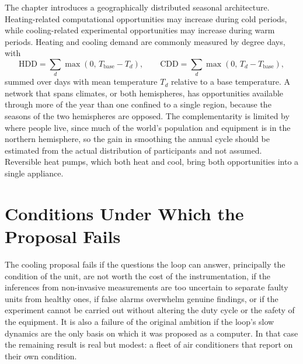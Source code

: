 The chapter introduces a geographically distributed seasonal architecture. Heating-related computational opportunities may increase during cold periods, while cooling-related experimental opportunities may increase during warm periods. Heating and cooling demand are commonly measured by degree days, with
\[
\mathrm{HDD}=\sum_{d}\max(0,\,T_{\mathrm{base}}-T_d),\qquad
\mathrm{CDD}=\sum_{d}\max(0,\,T_d-T_{\mathrm{base}}),
\]
summed over days with mean temperature $T_d$ relative to a base temperature. A network that spans climates, or both hemispheres, has opportunities available through more of the year than one confined to a single region, because the seasons of the two hemispheres are opposed. The complementarity is limited by where people live, since much of the world's population and equipment is in the northern hemisphere, so the gain in smoothing the annual cycle should be estimated from the actual distribution of participants and not assumed. Reversible heat pumps, which both heat and cool, bring both opportunities into a single appliance.

\section{Conditions Under Which the Proposal Fails}

The cooling proposal fails if the questions the loop can answer, principally the condition of the unit, are not worth the cost of the instrumentation, if the inferences from non-invasive measurements are too uncertain to separate faulty units from healthy ones, if false alarms overwhelm genuine findings, or if the experiment cannot be carried out without altering the duty cycle or the safety of the equipment. It is also a failure of the original ambition if the loop's slow dynamics are the only basis on which it was proposed as a computer. In that case the remaining result is real but modest: a fleet of air conditioners that report on their own condition.
